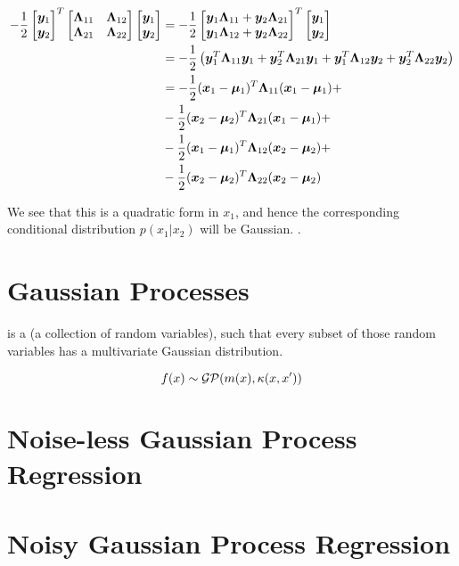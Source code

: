 \begin{align}
-\frac{1}{2} \begin{bmatrix} {\bm{y}}_1 \\ {\bm{y}}_2 \end{bmatrix} ^T {\begin{bmatrix} {{\bm{\Lambda}}_{11}} & {{\bm{\Lambda}}_{12}} \\ {{\bm{\Lambda}}_{21}} & {{\bm{\Lambda}}_{22}} \end{bmatrix}} \begin{bmatrix} {\bm{y}}_1 \\ {\bm{y}}_2 \end{bmatrix} &= -\frac{1}{2} \begin{bmatrix} {\bm{y}}_1 {{\bm{\Lambda}}_{11}} + {\bm{y}}_2 {{\bm{\Lambda}}_{21}} \\ {\bm{y}}_1 {{\bm{\Lambda}}_{12}} + {\bm{y}}_2 {{\bm{\Lambda}}_{22}} \end{bmatrix} ^T \begin{bmatrix} {\bm{y}}_1 \\ {\bm{y}}_2 \end{bmatrix} \\
&= -\frac{1}{2} \left( {\bm{y}}_1^T {{\bm{\Lambda}}_{11}} {\bm{y}}_1 + {\bm{y}}_2^T {{\bm{\Lambda}}_{21}} {\bm{y}}_1 + {\bm{y}}_1^T {{\bm{\Lambda}}_{12}} {\bm{y}}_2 + {\bm{y}}_2^T {{\bm{\Lambda}}_{22}} {\bm{y}}_2 \right) \\
&= -\frac{1}{2} ({\bm{x}}_1 - {\bm{\mu}}_1)^T {{\bm{\Lambda}}_{11}} ({\bm{x}}_1 - {\bm{\mu}}_1) + \\
  &-\frac{1}{2} ({\bm{x}}_2 - {\bm{\mu}}_2)^T {{\bm{\Lambda}}_{21}} ({\bm{x}}_1 - {\bm{\mu}}_1) + \\
  &-\frac{1}{2} ({\bm{x}}_1 - {\bm{\mu}}_1)^T {{\bm{\Lambda}}_{12}} ({\bm{x}}_2 - {\bm{\mu}}_2) + \\
  &-\frac{1}{2} ({\bm{x}}_2 - {\bm{\mu}}_2)^T {{\bm{\Lambda}}_{22}} ({\bm{x}}_2 - {\bm{\mu}}_2)
\end{align}


We see that this is a quadratic form in $x_1$, and hence the corresponding conditional distribution $p(x_1 | x_2)$ will be Gaussian. .


\section{Gaussian Processes}

 is a  (a collection of random variables), such that every subset of those random variables has a multivariate Gaussian distribution.

\begin{equation}
f(x) \sim {\mathcal{G}} {\mathcal{P}} (m(x), \kappa(x, x'))
\end{equation} 


\section{Noise-less Gaussian Process Regression}

\section{Noisy Gaussian Process Regression}
